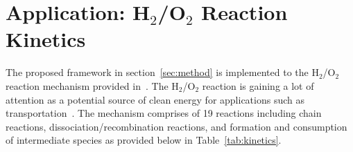 \section{Application: H$_2$/O$_2$ Reaction Kinetics}
\label{sec:app}

%
%

The proposed framework in section~\ref{sec:method} is implemented to 
the H$_2$/O$_2$ reaction mechanism provided in~\cite{Yetter:1991}.
The H$_2$/O$_2$ reaction is gaining a lot of attention as a potential
source of clean energy for applications such as 
transportation~\cite{Das:1996}. 
The mechanism comprises of 19 reactions including chain reactions,
dissociation/recombination reactions, and formation and consumption
of intermediate species as provided below in Table~\ref{tab:kinetics}.

